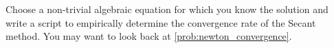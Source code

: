 \begin{problem}
    Choose a non-trivial algebraic equation for which you know the solution and write a
    script to empirically determine the convergence rate of the Secant method.  You may want to
    look back at \ref{prob:newton_convergence}.
\end{problem}


% 
% 
% 




